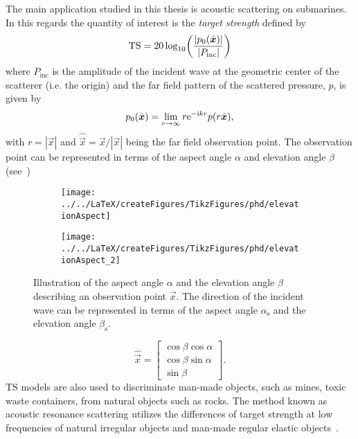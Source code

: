 The main application studied in this thesis is acoustic scattering on submarines. In this regards the quantity of interest is the \textit{target strength} defined by
\begin{equation}\label{Eq:TS}
	\TS = 20\log_{10}\left(\frac{|p_0(\hat{\vec{x}})|}{|P_{\mathrm{inc}}|}\right)
\end{equation}
where $P_{\mathrm{inc}}$ is the amplitude of the incident wave at the geometric center of the scatterer (i.e. the origin) and the far field pattern of the scattered pressure, $p$, is given by
\begin{equation}\label{Eq:farfield}
	p_0(\hat{\vec{x}}) =  \lim_{r\to\infty} r \euler^{-\imag k r}p(r\hat{\vec{x}}),
\end{equation}
with $r = |\vec{x}|$ and $\hat{\vec{x}} = \vec{x}/|\vec{x}|$ being the far field observation point. The observation point can be represented in terms of the aspect angle $\alpha$ and elevation angle $\beta$ (see~)
\begin{figure}
	\centering
	\begin{subfigure}[t]{0.49\textwidth}
		\centering
		\texttt{[image: ../../LaTeX/createFigures/TikzFigures/phd/elevationAspect]}
	\end{subfigure}%
	\hspace*{0.02\textwidth}%
	\begin{subfigure}[t]{0.49\textwidth}
		\centering
		\texttt{[image: ../../LaTeX/createFigures/TikzFigures/phd/elevationAspect\_2]}
	\end{subfigure}
	\caption{Illustration of the aspect angle $\alpha$ and the elevation angle $\beta$ describing an observation point $\vec{x}$. The direction of the incident wave can be represented in terms of the aspect angle $\alpha_{\mathrm{s}}$ and the elevation angle $\beta_{\mathrm{s}}$.}
	\label{Fig:elevationAspect}
\end{figure}
\begin{equation*}
	\hat{\vec{x}} = \begin{bmatrix}
		\cos\beta\cos\alpha\\
		\cos\beta\sin\alpha\\
		\sin\beta
	\end{bmatrix}.
\end{equation*}
TS models are also used to discriminate man-made objects, such as mines, toxic waste containers, from natural objects such as rocks. The method known as acoustic resonance scattering utilizes the differences of target strength at low frequencies of natural irregular objects and man-made regular elastic objects~\cite{Zampolli2007bsf,Zampolli2012ltm}. 
\newpage
